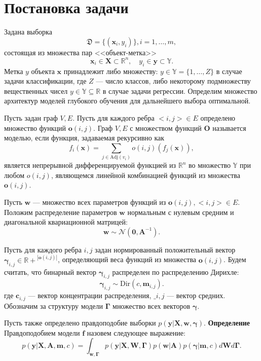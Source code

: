 \documentclass[12pt]{article}
\begin{document}
\section{Постановка задачи}
Задана выборка  \begin{equation}\label{eq:dataset}\mathfrak{D} = \{(\mathbf{x}_i,y_i)\}, i = 1,\dots,m,\end{equation} состоящая из множества пар <<объект-метка>> $$\mathbf{x}_i \in \mathbf{X} \subset \mathbb{R}^n, \quad {y}_i \in \mathbf{y} \subset \mathbb{Y}.$$ Метка ${y}$  объекта $\mathbf{x}$ принадлежит либо множеству: ${y} \in \mathbb{Y} = \{1, \dots, Z\}$ в случае задачи классификации, где $Z$ --- число классов, либо некоторому подмножеству вещественных чисел ${y} \in \mathbb{Y}  \subseteq \mathbb{R}$ в случае задачи регрессии. Определим множество архитектур моделей глубокого обучения для дальнейшего выбора оптимальной. 

Пусть задан граф $V,E$. Пусть для каждого ребра $<i,j> \in E$ определено множество функций $\mathbf{o}(i,j)$. Граф $V, E$ с множеством функций $\mathbf{O}$ называется моделью, если функция, задаваемая рекурсивно как 
\[
    f_i(\mathbf{x}) = \sum_{j \in \text{Adj}(v_i)} o(i,j) (f_{j}(\mathbf{x})), 
\]
является непрерывной дифференцируемой функцией из $\mathbb{R}^n$ во множество $\mathbb{Y}$ при любом $o(i,j)$, являющемся линейной комбинацией функций из множества $\mathbf{o}(i,j)$.

Пусть $\mathbf{w}$ --- множество всех параметров функций из $\mathbf{o}(i,j), <i,j> \in E$.
Положим распределение параметров $\mathbf{w}$ нормальным с нулевым средним и диагональной квариационной матрицей:
\[
    \mathbf{w} \sim \mathcal{N}(\mathbf{0}, \mathbf{A}^{-1}).
\]

Пусть для каждого ребра $i,j$ задан нормированный положительный вектор $\boldsymbol{\gamma}_{i,j} \in \mathbb{R+}^{|\mathbf{o}(i,j)|}$, определяющий веса функций из множества $\mathbf{o}(i,j)$.
Будем считать, что бинарный вектор $\boldsymbol{\gamma}_{i,j}$ распределен по распределению Дирихле:
\[
    \boldsymbol{\gamma}_{i,j}  \sim \text{Dir}({c}, \mathbf{m}_{i,j}).
\] 
где $\mathbf{c}_{i,j}$ --- вектор концентрации распределения, $\_{i,j}$ --- вектор средних. Обозначим за структуру модели $\boldsymbol{\Gamma}$ множество всех векторов $\boldsymbol{\gamma}$.

Пусть также определено правдоподобие выборки $p(\mathbf{y}|\mathbf{X}, \mathbf{w}, \boldsymbol{\gamma}).$
\textbf{Определение} Правдоподобием модели $\mathbf{f}$ назовем следующее выражение: 
\begin{equation}
\label{eq:evidence}
	p(\mathbf{y}|\mathbf{X},\mathbf{A},\mathbf{m}, c) = \int_{\mathbf{w}, \boldsymbol{\Gamma} } p(\mathbf{y}|\mathbf{X},\mathbf{W},  \boldsymbol{\Gamma})p(\mathbf{w}|\mathbf{A})p(\boldsymbol{\gamma}|\mathbf{m}, c)d\mathbf{W}d\mathbf{\Gamma}.
\end{equation}
\end{document}
